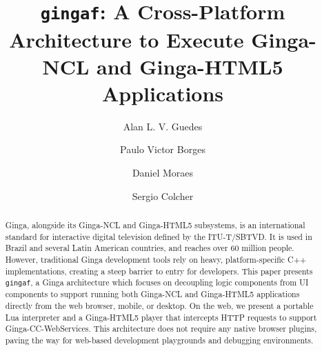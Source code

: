 \documentclass[sigconf]{webmedia}
\newcommand{\projectname}{\texttt{gingaf}}
\begin{document}
\title{\projectname{}: A Cross-Platform Architecture to Execute Ginga-NCL and Ginga-HTML5 Applications}

\author{Alan L. V. Guedes}

\author{Paulo Victor Borges}

\author{Daniel Moraes}

\author{Sergio Colcher}

\renewcommand{\shortauthors}{Guedes et al.}

\begin{abstract}
Ginga, alongside its Ginga-NCL and Ginga-HTML5 subsystems, is an international standard for interactive digital television defined by the ITU-T/SBTVD. It is used in Brazil and several Latin American countries, and reaches over 60 million people. However, traditional Ginga development tools rely on heavy, platform-specific C++ implementations, creating a steep barrier to entry for developers. This paper presents \projectname{}, a Ginga architecture which focuses on decoupling  logic components from UI components to support running both Ginga-NCL and Ginga-HTML5 applications directly from the web browser, mobile, or desktop. On the web, we present a portable Lua interpreter and a Ginga-HTML5 player that intercepts HTTP requests to support Ginga-CC-WebServices. This architecture does not require any native browser plugins, paving the way for web-based development playgrounds and debugging environments.
\end{abstract}

\end{document}
